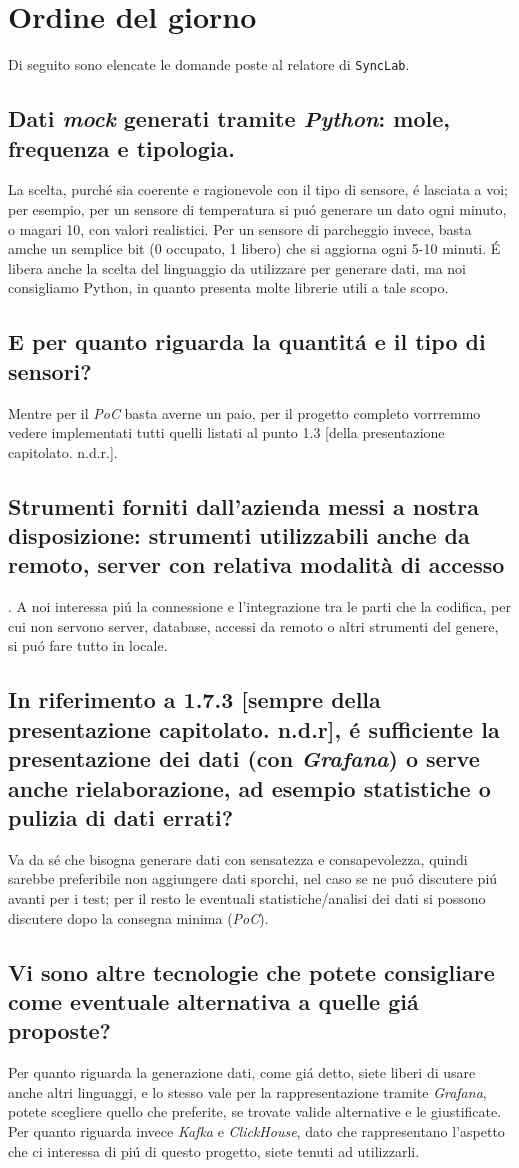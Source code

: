 \section{Ordine del giorno}
Di seguito sono elencate le domande poste al relatore di \texttt{SyncLab}.
\subsection{Dati \textit{mock} generati tramite \textit{Python}: mole, frequenza e tipologia.}
La scelta, purché sia coerente e ragionevole con il tipo di sensore, é lasciata a voi; per esempio, per un sensore di temperatura si puó generare un dato ogni minuto, o magari 10, con valori realistici. Per un sensore di parcheggio invece, basta amche un semplice bit (0 occupato, 1 libero) che si aggiorna ogni 5-10 minuti. É libera anche la scelta del linguaggio da utilizzare per generare dati, ma noi consigliamo Python, in quanto presenta molte librerie utili a tale scopo.
\subsection{E per quanto riguarda la quantitá e il tipo di sensori?}
Mentre per il \textit{PoC} basta averne un paio, per il progetto completo vorrremmo vedere implementati tutti quelli listati al punto 1.3 [della presentazione capitolato. n.d.r.].
\subsection{Strumenti forniti dall'azienda messi a nostra disposizione: strumenti utilizzabili anche da remoto, server con relativa modalità di accesso}.
A noi interessa piú la connessione e l'integrazione tra le parti che la codifica, per cui non servono server, database, accessi da remoto o altri strumenti del genere, si puó fare tutto in locale.
\subsection{In riferimento a 1.7.3 [sempre della presentazione capitolato. n.d.r], é sufficiente la presentazione dei dati (con \textit{Grafana}) o serve anche rielaborazione, ad esempio statistiche o pulizia di dati errati?}
Va da sé che bisogna generare dati con sensatezza e consapevolezza, quindi sarebbe preferibile non aggiungere dati sporchi, nel caso se ne puó discutere piú avanti per i test; per il resto le eventuali statistiche/analisi dei dati si possono discutere dopo la consegna minima (\textit{PoC}).
\subsection{Vi sono altre tecnologie che potete consigliare come eventuale alternativa a quelle giá proposte?}
Per quanto riguarda la generazione dati, come giá detto, siete liberi di usare anche altri linguaggi, e lo stesso vale per la rappresentazione tramite \textit{Grafana}, potete scegliere quello che preferite, se trovate valide alternative e le giustificate. Per quanto riguarda invece \textit{Kafka} e \textit{ClickHouse}, dato che rappresentano l'aspetto che ci interessa di piú di questo progetto, siete tenuti ad utilizzarli.
